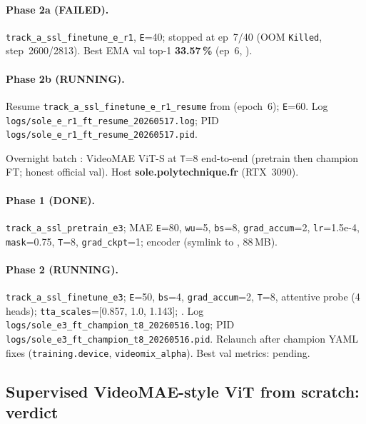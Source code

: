\begin{table}[ht]
\begin{minipage}{\linewidth}
\begin{description}[leftmargin=1.5em, style=nextline]
  \paragraph{Phase 2a (FAILED).} \texttt{track\_a\_ssl\_finetune\_e\_r1},
  \texttt{E}=40; stopped at ep~7/40 (OOM \texttt{Killed}, step~2600/2813).
  Best EMA val top-1 \textbf{33.57\,\%} (ep~6, ).
  \paragraph{Phase 2b (RUNNING).} Resume \texttt{track\_a\_ssl\_finetune\_e\_r1\_resume}
  from  (epoch~6); \texttt{E}=60.
  Log \texttt{logs/sole\_e\_r1\_ft\_resume\_20260517.log};
  PID \texttt{logs/sole\_e\_r1\_ft\_resume\_20260517.pid}.
\item[\textbf{Run E3 (Sole, batch 20260516)} (RUNNING)]
  Overnight batch : VideoMAE ViT-S at
  \texttt{T}=8 end-to-end (pretrain then champion FT; honest official val).
  Host \textbf{sole.polytechnique.fr} (RTX~3090).
  \paragraph{Phase 1 (DONE).} \texttt{track\_a\_ssl\_pretrain\_e3};
  MAE \texttt{E}=80, \texttt{wu}=5, \texttt{bs}=8, \texttt{grad\_accum}=2,
  \texttt{lr}=1.5e-4, \texttt{mask}=0.75, \texttt{T}=8,
  \texttt{grad\_ckpt}=1; encoder 
  (symlink to , 88\,MB).
  \paragraph{Phase 2 (RUNNING).} \texttt{track\_a\_ssl\_finetune\_e3};
  \texttt{E}=50, \texttt{bs}=4, \texttt{grad\_accum}=2, \texttt{T}=8,
  attentive probe (4 heads); \texttt{tta\_scales}=[0.857, 1.0, 1.143];
  .  Log \texttt{logs/sole\_e3\_ft\_champion\_t8\_20260516.log};
  PID \texttt{logs/sole\_e3\_ft\_champion\_t8\_20260516.pid}.
  Relaunch after champion YAML fixes (\texttt{training.device}, \texttt{videomix\_alpha}).
  Best val metrics: pending.
\end{description}
\end{minipage}
\end{table}

\subsection{Supervised VideoMAE-style ViT from scratch: verdict}
\label{sec:tracka:vit-from-scratch-verdict}

